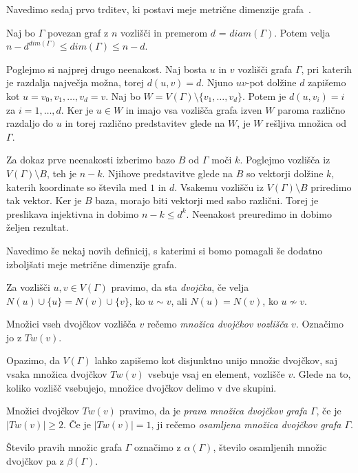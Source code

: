 \documentclass[mat1, tisk]{fmfdelo}
\begin{document}
Navedimo sedaj prvo trditev, ki postavi meje metrične dimenzije grafa~\cite{10chartrand}.
%
\begin{trditev}
  Naj bo $\Gamma$ povezan graf z $n$ vozlišči in premerom $d$ = $diam(\Gamma)$. Potem velja
  $n - d^{dim(\Gamma)} \leq dim(\Gamma) \leq n - d$.
\end{trditev}
\begin{dokaz}
  Poglejmo si najprej drugo neenakost. Naj bosta $u$ in $v$ vozlišči grafa 
  $\Gamma$, pri katerih je razdalja največja možna, torej $d(u,v) = d$. 
  Njuno $uv$-pot dolžine $d$ zapišemo kot $u=v_0, v_1, \ldots, v_d=v$. 
  Naj bo $W = V(\Gamma) \setminus \{v_1, \ldots, v_d \}$. Potem je 
  $d(u,v_i) = i$ za $i = 1, \ldots, d$. Ker je $u \in W$ in imajo 
  vsa vozlišča grafa izven $W$ paroma različno razdaljo do $u$ in 
  torej različno predstavitev glede na $W$, je $W$ 
  rešljiva množica od $\Gamma$.

  Za dokaz prve neenakosti izberimo bazo $B$ od $\Gamma$ moči $k$. 
  Poglejmo vozlišča iz $V(\Gamma) \setminus B$, teh je $n-k$. 
  Njihove predstavitve 
  glede na $B$ so vektorji dolžine $k$, katerih koordinate so števila med 
  $1$ in $d$. Vsakemu vozlišču iz $V(\Gamma) \setminus B$ priredimo 
  tak vektor. Ker je $B$ baza, morajo biti vektorji med sabo različni. 
  Torej je preslikava injektivna in dobimo $n - k \leq d^k$. 
  Neenakost preuredimo in dobimo željen rezultat.
\end{dokaz}
%
Navedimo še nekaj novih definicij, s katerimi si bomo pomagali še dodatno 
izboljšati meje metrične dimenzije grafa.
%
\begin{definicija}
  Za vozlišči $u, v\in V(\Gamma)$ pravimo, da sta \emph{dvojčka}, če velja 
  $N(u) \cup \{u\} = N(v) \cup \{v\} $, ko $u \sim v$, ali 
  $N(u) = N(v) $, ko $u \nsim v$.

  Množici vseh dvojčkov vozlišča $v$ rečemo \emph{množica dvojčkov vozlišča $v$}. 
  Označimo jo z $Tw(v)$.
\end{definicija}
%
Opazimo, da $V(\Gamma)$ lahko zapišemo kot disjunktno unijo množic 
dvojčkov, saj vsaka množica dvojčkov $Tw(v)$ vsebuje vsaj en element, vozlišče $v$.
Glede na to, koliko vozlišč vsebujejo, množice dvojčkov delimo v dve skupini.
%
\begin{definicija}
  Množici dvojčkov $Tw(v)$ pravimo, da je \emph{prava množica dvojčkov grafa $\Gamma$}, 
  če je $|Tw(v)| \geq 2$. Če je $|Tw(v)| = 1$, ji rečemo 
  \emph{osamljena množica dvojčkov grafa $\Gamma$}. 

  Število pravih množic grafa $\Gamma$ označimo z \emph{$\alpha(\Gamma)$}, število 
  osamljenih množic dvojčkov pa z \emph{$\beta(\Gamma)$}.
\end{definicija}
\end{document}
